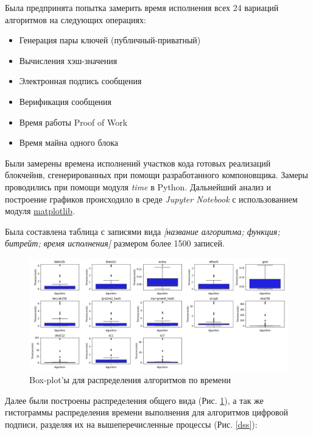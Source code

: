 Была предпринята попытка замерить время исполнения всех 24 вариаций алгоритмов на следующих операциях:

\begin{itemize}
\item Генерация пары ключей (публичный-приватный)
\item Вычисления хэш-значения
\item Электронная подпись сообщения
\item Верификация сообщения
\item Время работы Proof of Work
\item Время майна одного блока
\end{itemize}

Были замерены времена исполнений участков кода готовых реализаций блокчейнв,
сгенерированных при помощи разработанного компоновщика.
Замеры проводились при помощи модуля \emph{time} в Python. Дальнейший анализ и
построение графиков происходило в среде \emph{Jupyter Notebook} с
использованием модуля \underline{matplotlib}.

Была составлена таблица с записями вида \emph{[название алгоритма; функция; битрейт;
время исполнения]} размером более 1500 записей.

\begin{figure}
    \centering
    \includegraphics[width=\textwidth]{./images/boxes}
    \caption{Box-plot'ы для распределения алгоритмов по времени}\label{boxes}
\end{figure}

Далее были построены распределения общего вида (Рис. \ref{boxes}), а так же
гистограммы распределения времени выполнения для алгоритмов цифровой подписи,
разделяя их на вышеперечисленные процессы (Рис. \ref{dss}):

